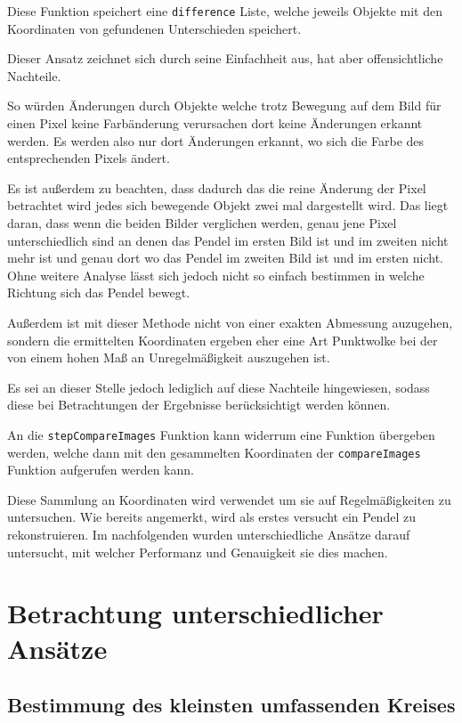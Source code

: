 Diese Funktion speichert eine \lstinline{difference} Liste, welche jeweils Objekte mit den Koordinaten von gefundenen Unterschieden speichert.

Dieser Ansatz zeichnet sich durch seine Einfachheit aus, hat aber offensichtliche Nachteile.

So würden Änderungen durch Objekte welche trotz Bewegung auf dem Bild für einen Pixel keine Farbänderung verursachen dort keine Änderungen erkannt werden.
Es werden also nur dort Änderungen erkannt, wo sich die Farbe des entsprechenden Pixels ändert.

Es ist außerdem zu beachten, dass dadurch das die reine Änderung der Pixel betrachtet wird jedes sich bewegende Objekt zwei mal dargestellt wird.
Das liegt daran, dass wenn die beiden Bilder verglichen werden, genau jene Pixel unterschiedlich sind an denen das Pendel im ersten Bild ist und im zweiten nicht mehr ist und genau dort wo das Pendel im zweiten Bild ist und im ersten nicht.
Ohne weitere Analyse lässt sich jedoch nicht so einfach bestimmen in welche Richtung sich das Pendel bewegt.

Außerdem ist mit dieser Methode nicht von einer exakten Abmessung auzugehen, sondern die ermittelten Koordinaten ergeben eher eine Art Punktwolke bei der von einem hohen Maß an Unregelmäßigkeit auszugehen ist.

Es sei an dieser Stelle jedoch lediglich auf diese Nachteile hingewiesen, sodass diese bei Betrachtungen der Ergebnisse berücksichtigt werden können.

An die \lstinline{stepCompareImages} Funktion kann widerrum eine Funktion übergeben werden, welche dann mit den gesammelten Koordinaten der \lstinline{compareImages} Funktion aufgerufen werden kann.

Diese Sammlung an Koordinaten wird verwendet um sie auf Regelmäßigkeiten zu untersuchen.
Wie bereits angemerkt, wird als erstes versucht ein Pendel zu rekonstruieren.
Im nachfolgenden wurden unterschiedliche Ansätze darauf untersucht, mit welcher Performanz und Genauigkeit sie dies machen.

\section{Betrachtung unterschiedlicher Ansätze}

\subsection{Bestimmung des kleinsten umfassenden Kreises}

